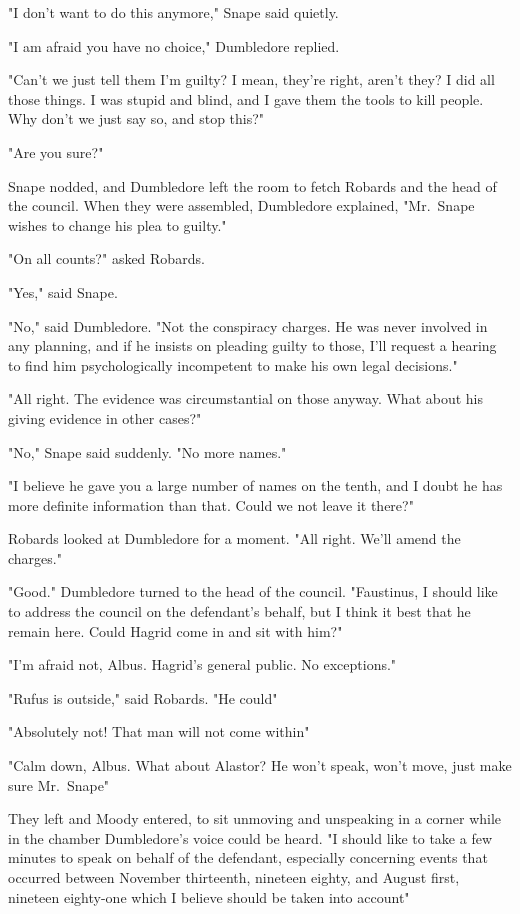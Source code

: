 "I don't want to do this anymore," Snape said quietly.

"I am afraid you have no choice," Dumbledore replied.

"Can't we just tell them I'm guilty? I mean, they're right, aren't they? I did all those things. I was stupid and blind, and I gave them the tools to kill people. Why don't we just say so, and stop this?"

"Are you sure?"

Snape nodded, and Dumbledore left the room to fetch Robards and the head of the council. When they were assembled, Dumbledore explained, "Mr.~Snape wishes to change his plea to guilty."

"On all counts?" asked Robards.

"Yes," said Snape.

"No," said Dumbledore. "Not the conspiracy charges. He was never involved in any planning, and if he insists on pleading guilty to those, I'll request a hearing to find him psychologically incompetent to make his own legal decisions."

"All right. The evidence was circumstantial on those anyway. What about his giving evidence in other cases?"

"No," Snape said suddenly. "No more names."

"I believe he gave you a large number of names on the tenth, and I doubt he has more definite information than that. Could we not leave it there?"

Robards looked at Dumbledore for a moment. "All right. We'll amend the charges."

"Good." Dumbledore turned to the head of the council. "Faustinus, I should like to address the council on the defendant's behalf, but I think it best that he remain here. Could Hagrid come in and sit with him?"

"I'm afraid not, Albus. Hagrid's general public. No exceptions."

"Rufus is outside," said Robards. "He could{\el}"

"Absolutely not! That man will not come within{\el}"

"Calm down, Albus. What about Alastor? He won't speak, won't move, just make sure Mr.~Snape{\el}"

They left and Moody entered, to sit unmoving and unspeaking in a corner while in the chamber Dumbledore's voice could be heard. "I should like to take a few minutes to speak on behalf of the defendant, especially concerning events that occurred between November thirteenth, nineteen eighty, and August first, nineteen eighty-one which I believe should be taken into account{\el}"

